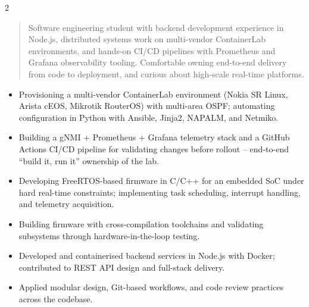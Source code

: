 \documentclass[10pt,a4paper,ragged2e,withhyper]{altacv}
\begin{document}
\begin{paracol}{2}

        \newpage

        \switchcolumn

            \begin{quote}
            Software engineering student with backend development experience in Node.js, distributed systems work on multi-vendor ContainerLab environments, and hands-on CI/CD pipelines with Prometheus and Grafana observability tooling. Comfortable owning end-to-end delivery from code to deployment, and curious about high-scale real-time platforms.
            \end{quote}

            \begin{itemize}
                \item Provisioning a multi-vendor ContainerLab environment (Nokia SR Linux, Arista cEOS, Mikrotik RouterOS) with multi-area OSPF; automating configuration in Python with Ansible, Jinja2, NAPALM, and Netmiko.
                \item Building a gNMI + Prometheus + Grafana telemetry stack and a GitHub Actions CI/CD pipeline for validating changes before rollout -- end-to-end ``build it, run it'' ownership of the lab.
            \end{itemize}

            \begin{itemize}
                \item Developing FreeRTOS-based firmware in C/C++ for an embedded SoC under hard real-time constraints; implementing task scheduling, interrupt handling, and telemetry acquisition.
                \item Building firmware with cross-compilation toolchains and validating subsystems through hardware-in-the-loop testing.
            \end{itemize}

            \begin{itemize}
                \item Developed and containerised backend services in Node.js with Docker; contributed to REST API design and full-stack delivery.
                \item Applied modular design, Git-based workflows, and code review practices across the codebase.
            \end{itemize}
            \divider


\end{paracol}
\end{document}
